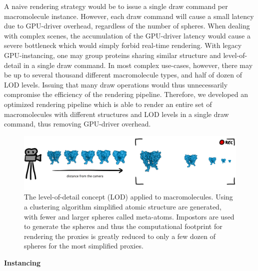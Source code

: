 A naive rendering strategy would be to issue a single draw command per macromolecule instance.
However, each draw command will cause a small latency due to GPU-driver overhead, regardless of the number of spheres.
When dealing with complex scenes, the accumulation of the GPU-driver latency would cause a severe bottleneck which would simply forbid real-time rendering.
With legacy GPU-instancing, one may group proteins sharing similar structure and level-of-detail in a single draw command.
In most complex use-cases, however, there may be up to several thousand different macromolecule types, and half of dozen of LOD levels.
Issuing that many draw operations would thus unnecessarily compromise the efficiency of the rendering pipeline.
Therefore, we developed an optimized rendering pipeline which is able to render an entire set of macromolecules with different structures and LOD levels in a single draw command, thus removing GPU-driver overhead.

\begin{figure}
\centering
\includegraphics[width=0.99\linewidth]{graphics/lod}
\caption{The level-of-detail concept (LOD) applied to macromolecules. Using a clustering algorithm simplified atomic structure are generated, with fewer and larger spheres called meta-atoms.
Impostors are used to generate the spheres and thus the computational footprint for rendering the proxies is greatly reduced to only a few dozen of spheres for the most simplified proxies.}
\label{fig:lod}
\end{figure}

\textbf{Instancing}

